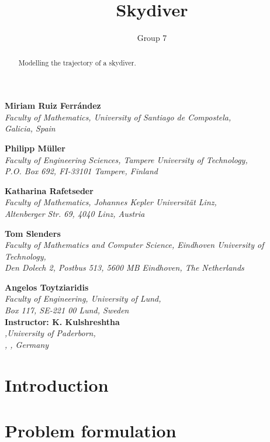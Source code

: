 \documentclass[12pt,a4paper]{article}
\author{Group 7}
\begin{document}
\title{Skydiver}
\maketitle

\begin{center}
\textbf{Miriam Ruiz Ferrández}\\
\textit{Faculty of Mathematics, University of Santiago de Compostela,\\
Galicia, Spain}

\textbf{Philipp M\"{u}ller}\\
\textit{Faculty of Engineering Sciences, Tampere University of Technology,\\
P.O. Box 692, FI-33101 Tampere, Finland}

\textbf{Katharina Rafetseder}\\
\textit{Faculty of Mathematics, Johannes Kepler Universit\"{a}t Linz,\\
Altenberger Str. 69, 4040 Linz, Austria}

\textbf{Tom Slenders}\\
\textit{Faculty of Mathematics and Computer Science, Eindhoven University of Technology,\\
Den Dolech 2, Postbus 513, 5600 MB Eindhoven, The Netherlands}

\textbf{Angelos Toytziaridis}\\
\textit{Faculty of Engineering, University of Lund,\\
Box 117, SE-221 00  Lund, Sweden}\\
\vspace{1cm}
\textbf{Instructor: K. Kulshreshtha }\\
\textit{ ,University of Paderborn,\\
, , Germany}

\end{center}

\thispagestyle{empty}
\newpage
\begin{abstract}
Modelling the trajectory of a skydiver.
\end{abstract}
\newpage
\section{Introduction}


\section{Problem formulation}

\end{document}
